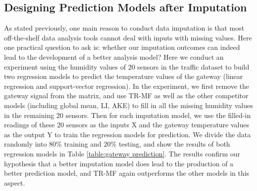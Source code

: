 

\subsection{Designing Prediction Models after Imputation}\label{subsec:furtherPredict}
As stated previously, one main reason to conduct data imputation is that most off-the-shelf data analysis tools cannot deal with inputs with missing values. Here one practical question to ask is: whether our imputation outcomes can indeed lead to the development of a better analysis model? Here we conduct an experiment using the humidity values of 20 sensors in the traffic dataset to build two regression models to predict the temperature values of the gateway (linear regression and support-vector regression). In the experiment, we first remove the gateway signal from the matrix, and use TR-MF as well as the other competitor models (including global mean, LI, AKE) to fill in all the missing humidity values in the remaining 20 sensors. Then for each imputation model, we use the filled-in readings of these 20 sensors as the inputs X and the gateway temperature values as the output Y to train the regression models for prediction. We divide the data randomly into 80\% training and 20\% testing, and show the results of both regression models in Table \ref{table:gateway prediction}. The results confirm our hypothesis that a better imputation model does lead to the production of a better prediction model, and TR-MF again outperforms the other models in this aspect.




